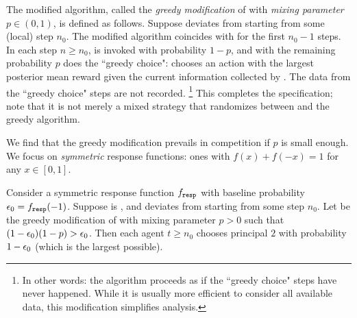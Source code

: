 The modified algorithm, called the \emph{greedy modification} of \alg  with \emph{mixing parameter} $p\in (0,1)$, is defined as follows. Suppose \alg deviates from \DynGreedy starting from some (local) step $n_0$.
The modified algorithm coincides with \DynGreedy
for the first $n_0-1$ steps.
In each step $n\geq n_0$, \alg is invoked with probability
  $1-p$, and with the remaining probability $p$ does the ``greedy
  choice": chooses an action with the largest posterior mean reward
  given the current information collected by \alg.
The data from the ``greedy choice" steps are not recorded.%
\footnote{In other words: the algorithm proceeds as if the ``greedy choice" steps have never happened.  While it is usually more efficient to consider all available data, this modification simplifies analysis.}
This completes the specification; note that it is not merely
a mixed strategy that randomizes between \alg and the greedy algorithm.




We find that the greedy modification prevails in competition if $p$ is small enough. We focus on \emph{symmetric} response functions: ones with
$f(x)+f(-x)=1$ for any $x\in[0,1]$.

\begin{theorem}\label{thm:random-greedy}
Consider a symmetric \HardMaxRandom response function $f_{\mathtt{resp}}$ with baseline probability $\epsilon_0 = f_{\mathtt{resp}}(-1)$. Suppose \alg[1] is \bmonotone, and deviates from \DynGreedy starting from some step $n_0$. Let \alg[2] be the greedy modification of \alg[1] with mixing parameter $p>0$ such that
    $(1-\epsilon_0)(1-p)>\epsilon_0$.
Then each agent $t\geq n_0$ chooses principal $2$ with probability $1-\epsilon_0$ (which is the largest possible).
\end{theorem}

